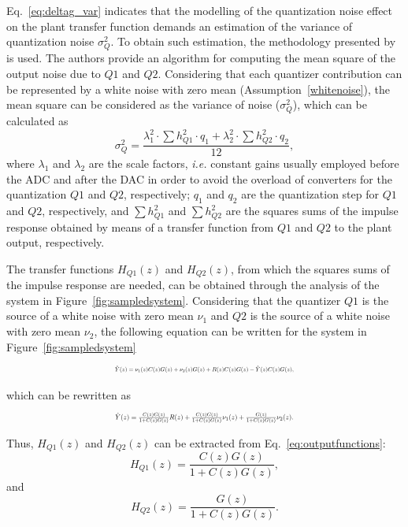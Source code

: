 \documentclass{sig-alternate-05-2015}
\newcommand{\red}[1]{{\color{red}#1}}
\begin{document}
Eq.~\eqref{eq:deltag_var} indicates that the modelling of the quantization noise
effect on the plant transfer function demands an estimation of the variance
of quantization noise $\sigma_{Q}^{2}$.  To obtain such estimation, the
methodology presented by~\cite{widrow2008quantization}
is used.  The authors provide an algorithm for computing the mean square of
the output noise due to $Q1$ and $Q2$.  Considering that each quantizer
contribution can be represented by a white noise with zero mean
(Assumption~\ref{whitenoise}), the mean square can be considered as the
variance of noise ($\sigma_{Q}^{2}$), which can be calculated as
%
\begin{equation}
\sigma_{Q}^{2}=\frac{\lambda_{1}^{2}\cdot \sum {h_{Q1}^{2}} \cdot q_{1}+\lambda_{2}^{2}\cdot \sum {h_{Q2}^{2}} \cdot q_{2}}{12},
\end{equation}
%
\noindent where $\lambda_{1}$ and $\lambda_{2}$ are the scale factors, {\it i.e.} constant gains usually employed before the ADC and after the DAC in order to avoid the overload of converters  %
for the quantization $Q1$ and $Q2$, respectively; $q_{1}$ and $q_{2}$ are the quantization step for $Q1$ and $Q2$, respectively, and $\sum {h_{Q1}^{2}}$ and $\sum
{h_{Q2}^{2}}$ are the squares sums of the impulse response obtained by means
of a transfer function from $Q1$ and $Q2$ to the plant output, respectively.

The transfer functions $H_{Q1}(z)$ and $H_{Q2}(z)$, from which the squares
sums of the impulse response are needed, can be obtained through the
analysis of the system in Figure~\ref{fig:sampledsystem}.  Considering that
the quantizer $Q1$ is the source of a white noise with zero mean $\nu_{1}$
and $Q2$ is the source of a white noise with zero mean $\nu_{2}$, the
following equation can be written for the system in
Figure~\ref{fig:sampledsystem}
%
\begin{equation}
\resizebox{0.48\textwidth}{!}{
$\hat{Y}(z)=\nu_{1}(z)C(z)G(z)+\nu_{2}(z)G(z)+R(z)C(z)G(z)-\hat{Y}(z)C(z)G(z),$
}
\end{equation}

\noindent which can be rewritten as
%
\begin{equation}
\label{eq:outputfunctions}
\resizebox{0.48\textwidth}{!}{
$\hat{Y}(z)=\frac{C(z)G(z)}{1+C(z)G(z)}R(z)+\frac{C(z)G(z)}{1+C(z)G(z)}\nu_{1}(z) \\
+\frac{G(z)}{1+C(z)G(z)}\nu_{2}(z).$
}
\end{equation}

Thus, $H_{Q1}(z)$ and $H_{Q2}(z)$ can be extracted from Eq.~\eqref{eq:outputfunctions}:
\begin{equation}
H_{Q1}(z)=\frac{C(z)G(z)}{1+C(z)G(z)},
\end{equation}
and
\begin{equation}
H_{Q2}(z)=\frac{G(z)}{1+C(z)G(z)}.
\end{equation}
\end{document}
